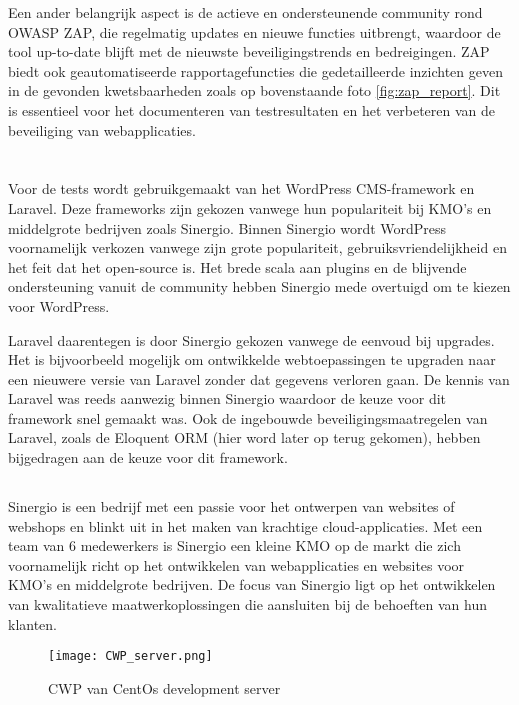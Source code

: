 Een ander belangrijk aspect is de actieve en ondersteunende community 
rond OWASP ZAP, die regelmatig updates en nieuwe functies uitbrengt, waardoor de tool up-to-date blijft met de nieuwste 
beveiligingstrends en bedreigingen. ZAP biedt ook geautomatiseerde rapportagefuncties die gedetailleerde inzichten geven 
in de gevonden kwetsbaarheden zoals op bovenstaande foto \ref{fig:zap_report}. Dit is essentieel voor het documenteren van testresultaten en het verbeteren van de beveiliging 
van webapplicaties. 

\section{}
Voor de tests wordt gebruikgemaakt van het WordPress CMS-framework en Laravel. Deze frameworks zijn gekozen vanwege hun 
populariteit bij KMO's en middelgrote bedrijven zoals Sinergio. Binnen Sinergio wordt WordPress voornamelijk verkozen vanwege 
zijn grote populariteit, gebruiksvriendelijkheid en het feit dat het open-source is. Het brede scala aan plugins en de 
blijvende ondersteuning vanuit de community hebben Sinergio mede overtuigd om te kiezen voor WordPress. 


Laravel daarentegen is door Sinergio gekozen vanwege de eenvoud bij upgrades. Het is bijvoorbeeld mogelijk om ontwikkelde webtoepassingen 
te upgraden naar een nieuwere versie van Laravel zonder dat gegevens verloren gaan. De kennis van Laravel was 
reeds aanwezig binnen Sinergio waardoor de keuze voor dit framework snel gemaakt was. Ook de ingebouwde beveiligingsmaatregelen 
van Laravel, zoals de Eloquent ORM (hier word later op terug gekomen), hebben bijgedragen aan de keuze voor dit framework.

\subsection{}
Sinergio is een bedrijf met een passie voor het ontwerpen van websites of webshops en blinkt 
uit in het maken van krachtige cloud-applicaties. Met een team van 6 medewerkers is Sinergio een kleine KMO op de markt 
die zich voornamelijk richt op het ontwikkelen van webapplicaties en websites voor KMO's en middelgrote bedrijven. De focus 
van Sinergio ligt op het ontwikkelen van kwalitatieve maatwerkoplossingen die aansluiten bij de behoeften van hun klanten.

\begin{figure}
    \centering
    \texttt{[image: CWP\_server.png]}
    \caption[CWP van CentOs development server]{CWP van CentOs development server}
    \label{fig:centos_server}
\end{figure}
